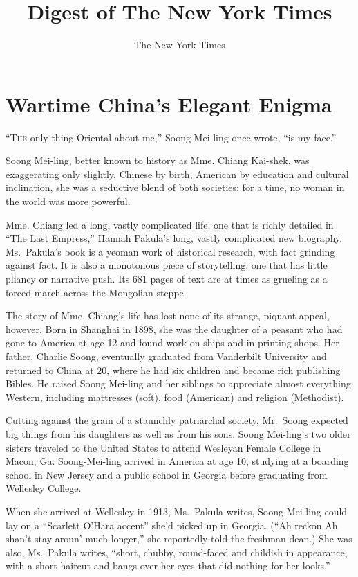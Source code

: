 ﻿\documentclass[12pt]{article}
\title{Digest of The New York Times}
\author{The New York Times}
\begin{document}
\date{}
\thispagestyle{empty}
\renewcommand\contentsname{\textsf{Digest of The New York Times}}
{\footnotesize\textsf{\tableofcontents}}
\clearpage
\setcounter{page}{1}

\section{Wartime China's Elegant Enigma}

\lettrine{``T}{he} only thing Oriental about me,'' Soong Mei-ling once
wrote, ``is my face.''

Soong Mei-ling, better known to history as Mme. Chiang Kai-shek, was exaggerating only slightly.
Chinese by birth, American by education and cultural inclination, she was a
seductive\cite{seductive} blend of both societies; for a time, no woman in the world was more
powerful.

Mme. Chiang led a long, vastly complicated life, one that is richly detailed in ``The Last
Empress,'' Hannah Pakula's long, vastly complicated new biography. Ms.~Pakula's book is a yeoman
work of historical research, with fact grinding against fact. It is also a monotonous piece of
storytelling, one that has little pliancy or narrative push. Its 681 pages of text are at times as
grueling as a forced march across the Mongolian steppe.

The story of Mme. Chiang's life has lost none of its strange, piquant appeal, however. Born in
Shanghai in 1898, she was the daughter of a peasant who had gone to America at age 12 and found work
on ships and in printing shops. Her father, Charlie Soong, eventually graduated from Vanderbilt
University and returned to China at 20, where he had six children and became rich publishing Bibles.
He raised Soong Mei-ling and her siblings to appreciate almost everything Western, including
mattresses (soft), food (American) and religion (Methodist).

Cutting against the grain of a staunchly patriarchal society, Mr.~Soong expected big things from his
daughters as well as from his sons. Soong Mei-ling's two older sisters traveled to the United States
to attend Wesleyan Female College in Macon, Ga. Soong-Mei-ling arrived in America at age 10,
studying at a boarding school in New Jersey and a public school in Georgia before graduating from
Wellesley College.

When she arrived at Wellesley in 1913, Ms.~Pakula writes, Soong Mei-ling could lay on a ``Scarlett
O'Hara accent'' she'd picked up in Georgia. (``Ah reckon Ah shan't stay aroun' much longer,'' she
reportedly told the freshman dean.) She was also, Ms.~Pakula writes, ``short, chubby, round-faced
and childish in appearance, with a short haircut and bangs over her eyes that did nothing for her
looks.''
\end{document}
